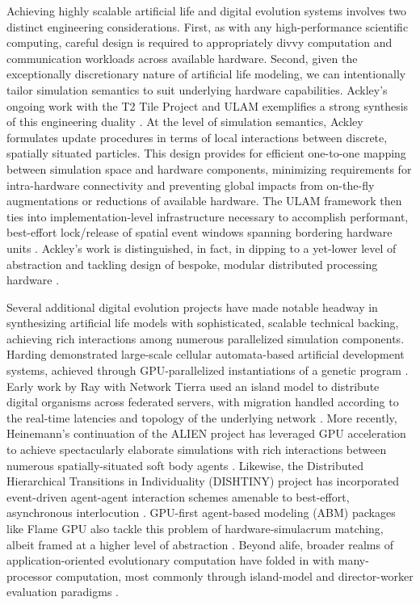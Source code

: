 Achieving highly scalable artificial life and digital evolution systems involves two distinct engineering considerations.
First, as with any high-performance scientific computing, careful design is required to appropriately divvy computation and communication workloads across available hardware.
Second, given the exceptionally discretionary nature of artificial life modeling, we can intentionally tailor simulation semantics to suit underlying hardware capabilities.
Ackley's ongoing work with the T2 Tile Project and ULAM exemplifies a strong synthesis of this engineering duality \citep{ackley2016ulam}.
At the level of simulation semantics, Ackley formulates update procedures in terms of local interactions between discrete, spatially situated particles.
This design provides for efficient one-to-one mapping between simulation space and hardware components, minimizing requirements for intra-hardware connectivity and preventing global impacts from on-the-fly augmentations or reductions of available hardware.
The ULAM framework then ties into implementation-level infrastructure necessary to accomplish performant, best-effort lock/release of spatial event windows spanning bordering hardware units \citep{ackley2013movable}.
Ackley's work is distinguished, in fact, in dipping to a yet-lower level of abstraction and tackling design of bespoke, modular distributed processing hardware \citep{ackley2011homeostatic,ackley2023robust,livingcomputationSFBSanta}.

Several additional digital evolution projects have made notable headway in synthesizing artificial life models with sophisticated, scalable technical backing, achieving rich interactions among numerous parallelized simulation components.
Harding demonstrated large-scale cellular automata-based artificial development systems, achieved through GPU-parallelized instantiations of a genetic program  \citep{harding2007fast_ieee}.
Early work by Ray with Network Tierra used an island model to distribute digital organisms across federated servers, with migration handled according to the real-time latencies and topology of the underlying network \citep{ray1995proposal}.
More recently, Heinemann's continuation of the ALIEN project has leveraged GPU acceleration to achieve spectacularly elaborate simulations with rich interactions between numerous spatially-situated soft body agents \citep{heinemann2008artificial}.
Likewise, the Distributed Hierarchical Transitions in Individuality (DISHTINY) project has incorporated event-driven agent-agent interaction schemes amenable to best-effort, asynchronous interlocution \citep{moreno2022exploring,moreno2021conduit}.
GPU-first agent-based modeling (ABM) packages like Flame GPU also tackle this problem of hardware-simulacrum matching, albeit framed at a higher level of abstraction \citep{richmond2010high}.
Beyond alife, broader realms of application-oriented evolutionary computation have folded in with many-processor computation, most commonly through island-model and director-worker evaluation paradigms \citep{abdelhafez2019performance,cantu2001master}.

